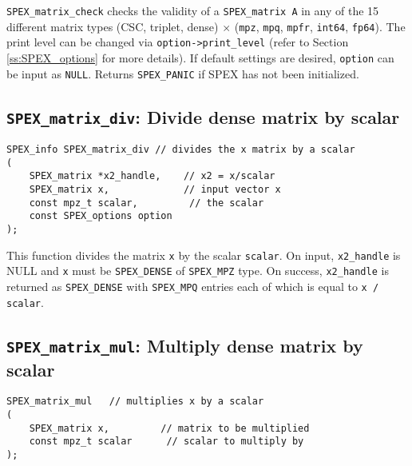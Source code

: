 \documentclass[12pt]{report}
\theoremstyle{definition}
\begin{document}
\verb|SPEX_matrix_check| checks the validity of a \verb|SPEX_matrix A| in any
of the 15 different matrix types (CSC, triplet, dense) $\times$ (\verb|mpz|,
\verb|mpq|, \verb|mpfr|, \verb|int64|, \verb|fp64|). The print level can be
changed via \verb|option->print_level| (refer to Section \ref{ss:SPEX_options}
for more details).  If default settings are desired, \verb|option| can be input
as \verb|NULL|.  Returns \verb|SPEX_PANIC| if SPEX has not been initialized.


\newpage
\cprotect\subsection{\verb|SPEX_matrix_div|: Divide dense matrix by scalar}

\begin{mdframed}[userdefinedwidth=6in]
{\footnotesize
\begin{verbatim}
SPEX_info SPEX_matrix_div // divides the x matrix by a scalar
(
    SPEX_matrix *x2_handle,    // x2 = x/scalar
    SPEX_matrix x,             // input vector x
    const mpz_t scalar,         // the scalar
    const SPEX_options option
);
\end{verbatim}
} \end{mdframed}

This function divides the matrix \verb|x| by the scalar \verb|scalar|. On input, \verb|x2_handle| is NULL and \verb|x| must be \verb|SPEX_DENSE| of \verb|SPEX_MPZ| type. On success, \verb|x2_handle| is returned as \verb|SPEX_DENSE| with \verb|SPEX_MPQ| entries each of which is equal to \verb|x / scalar|.

\cprotect\subsection{\verb|SPEX_matrix_mul|: Multiply dense matrix by scalar}

\begin{mdframed}[userdefinedwidth=6in]
{\footnotesize
\begin{verbatim}
SPEX_matrix_mul   // multiplies x by a scalar
(
    SPEX_matrix x,         // matrix to be multiplied
    const mpz_t scalar      // scalar to multiply by
);
\end{verbatim}
} \end{mdframed}
\end{document}
